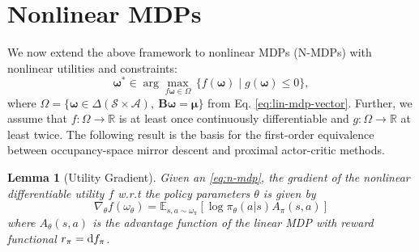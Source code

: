 \documentclass{article}
\theoremstyle{plain}
\newtheorem{lemma}[theorem]{Lemma}
\theoremstyle{definition}
\theoremstyle{remark}
\newcommand{\sS}{\mathcal{S}}
\newcommand{\sA}{\mathcal{A}}
\begin{document}

\section{Nonlinear MDPs}\label{app:nonlinear-mdps}
We now extend the above framework to nonlinear MDPs (N-MDPs) with nonlinear utilities and constraints:
\begin{equation}\label{eq:n-mdp-app}
    \boldsymbol{\omega^*} \in \arg \max_{f\boldsymbol{\omega}\in\Omega}\, \{f(\boldsymbol{\omega})
    \mid g(\boldsymbol{\omega})\leq 0\},
\end{equation}
where $\Omega = \{\boldsymbol{\omega} \in \Delta(\sS\times\sA),\ \boldsymbol{B}\boldsymbol{\omega}=\boldsymbol{\mu}\}$ from Eq. \ref{eq:lin-mdp-vector}.
Further, we assume that $f:\Omega \to \mathbb{R}$ is at least once continuously differentiable and $g:\Omega \to \mathbb{R}$ at least twice.
The following result is the basis for the first-order equivalence between occupancy-space mirror descent and proximal actor-critic methods.

\begin{lemma}[Utility Gradient]
    Given an \ref{eq:n-mdp}, the gradient of the nonlinear differentiable utility $f$ w.r.t the policy parameters $\theta$ is given by
    \begin{equation}\label{eq:utility-gradient}
        \nabla_\theta f(\omega_\theta) = \mathbb{E}_{s,a\sim\omega_\pi}[\log \pi_\theta(a|s) A_\pi(s,a)]
    \end{equation}
    where $A_\theta(s,a)$ is the advantage function of the linear MDP with reward functional $r_\pi = \textup{d}f_\pi$.
\end{lemma}
\end{document}

